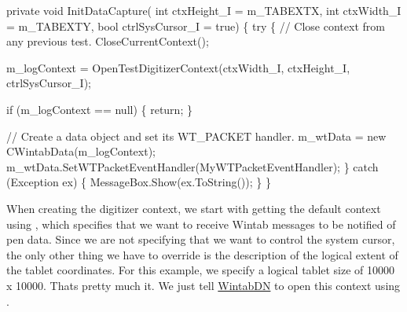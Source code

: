 \begin{DoxyCode}
\textcolor{keyword}{private} \textcolor{keywordtype}{void} InitDataCapture(
\textcolor{keywordtype}{int} ctxHeight\_I = m\_TABEXTX, \textcolor{keywordtype}{int} ctxWidth\_I = m\_TABEXTY, \textcolor{keywordtype}{bool} ctrlSysCursor\_I = \textcolor{keyword}{true})
\{
    \textcolor{keywordflow}{try}
    \{
        \textcolor{comment}{// Close context from any previous test.}
        CloseCurrentContext();

        m\_logContext = OpenTestDigitizerContext(ctxWidth\_I, ctxHeight\_I,  ctrlSysCursor\_I);

        \textcolor{keywordflow}{if} (m\_logContext == null)
        \{
            \textcolor{keywordflow}{return};
        \}

        \textcolor{comment}{// Create a data object and set its WT\_PACKET handler.}
        m\_wtData = \textcolor{keyword}{new} CWintabData(m\_logContext);
        m\_wtData.SetWTPacketEventHandler(MyWTPacketEventHandler);
    \}
    \textcolor{keywordflow}{catch} (Exception ex)
    \{
        MessageBox.Show(ex.ToString());
    \}
\}
\end{DoxyCode}


When creating the digitizer context, we start with getting the default context using {}, which specifies that we want to receive Wintab messages to be notified of pen data. Since we are not specifying that we want to control the system cursor, the only other thing we have to override is the description of the logical extent of the tablet coordinates. For this example, we specify a logical tablet size of 10000 x 10000. That\textquotesingle{}s pretty much it. We just tell \mbox{\hyperlink{namespace_wintab_d_n}{Wintab\+DN}} to open this context using {}.


